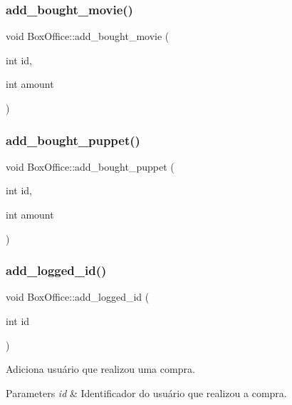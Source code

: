 \subsubsection{\texorpdfstring{add\+\_\+bought\+\_\+movie()}{add\_bought\_movie()}}
{\footnotesize\ttfamily void Box\+Office\+::add\+\_\+bought\+\_\+movie (\begin{DoxyParamCaption}\item[{int}]{id,  }\item[{int}]{amount }\end{DoxyParamCaption})}

\mbox{\label{class_box_office_a5c199bd7e33a559fc23067d307b52c39}} 
\subsubsection{\texorpdfstring{add\+\_\+bought\+\_\+puppet()}{add\_bought\_puppet()}}
{\footnotesize\ttfamily void Box\+Office\+::add\+\_\+bought\+\_\+puppet (\begin{DoxyParamCaption}\item[{int}]{id,  }\item[{int}]{amount }\end{DoxyParamCaption})}

\mbox{\label{class_box_office_a1a4c56a8bf4e54598a27e03fc256ab85}} 
\subsubsection{\texorpdfstring{add\+\_\+logged\+\_\+id()}{add\_logged\_id()}}
{\footnotesize\ttfamily void Box\+Office\+::add\+\_\+logged\+\_\+id (\begin{DoxyParamCaption}\item[{int}]{id }\end{DoxyParamCaption})\hspace{0.3cm}{\ttfamily [inline]}}



Adiciona usuário que realizou uma compra. 


\begin{DoxyParams}{Parameters}
{\em id} & Identificador do usuário que realizou a compra. \\
\hline
\end{DoxyParams}
\mbox{\label{class_box_office_afc1cff94d7c768f3435089e5f6bc3c50}} 
